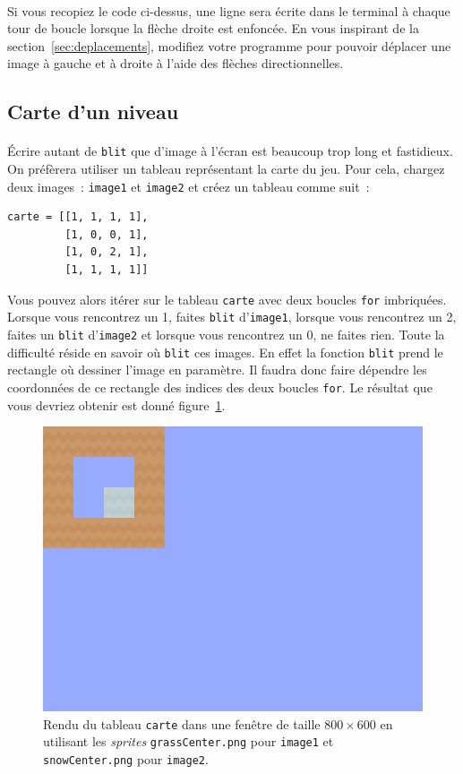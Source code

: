 \paragraph{}
Si vous recopiez le code ci-dessus, une ligne sera écrite dans le terminal à chaque tour de boucle lorsque la flèche droite est enfoncée.
En vous inspirant de la section~\ref{sec:deplacements}, modifiez votre programme pour pouvoir déplacer une image à gauche et à droite à l'aide des flèches directionnelles.

\subsection{Carte d'un niveau}
\label{sec:carte}

\paragraph{}
Écrire autant de \texttt{blit} que d'image à l'écran est beaucoup trop long et fastidieux.
On préfèrera utiliser un tableau représentant la carte du jeu.
Pour cela, chargez deux images~: \texttt{image1} et \texttt{image2} et créez un tableau comme suit~:
\begin{verbatim}
carte = [[1, 1, 1, 1],
         [1, 0, 0, 1],
         [1, 0, 2, 1],
         [1, 1, 1, 1]]
\end{verbatim}
Vous pouvez alors itérer sur le tableau \texttt{carte} avec deux boucles \texttt{for} imbriquées.
Lorsque vous rencontrez un 1, faites \texttt{blit} d'\texttt{image1}, lorsque vous rencontrez un 2, faites un \texttt{blit} d'\texttt{image2} et lorsque vous rencontrez un 0, ne faites rien.
Toute la difficulté réside en savoir où \texttt{blit} ces images.
En effet la fonction \texttt{blit} prend le rectangle où dessiner l'image en paramètre.
Il faudra donc faire dépendre les coordonnées de ce rectangle des indices des deux boucles \texttt{for}.
Le résultat que vous devriez obtenir est donné figure~\ref{fig:carte}.

\begin{figure}[t]
	\centering
	\includegraphics[width=.5\textwidth]{carte.png}
	\caption{Rendu du tableau \texttt{carte} dans une fenêtre de taille \(800\times 600\) en utilisant les \emph{sprites} \texttt{grassCenter.png} pour \texttt{image1} et \texttt{snowCenter.png} pour \texttt{image2}.}
	\label{fig:carte}
\end{figure}

